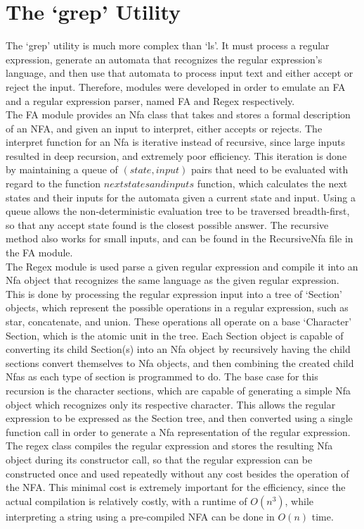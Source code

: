 \documentclass{article}
\begin{document}
\section*{The `grep' Utility}
The `grep' utility is much more complex than `ls'. It must process a regular expression, generate an automata that recognizes the regular expression's language, and then use that automata to process input text and either accept or reject the input. Therefore, modules were developed in order to emulate an FA and a regular expression parser, named FA and Regex respectively. \\
\indent The FA module provides an Nfa class that takes and stores a formal description of an NFA, and given an input to interpret, either accepts or rejects. The interpret function for an Nfa is iterative instead of recursive, since large inputs resulted in deep recursion, and extremely poor efficiency. This iteration is done by maintaining a queue of $(state, input)$ pairs that need to be evaluated with regard to the function $nextstatesandinputs$ function, which calculates the next states and their inputs for the automata given a current state and input. Using a queue allows the non-deterministic evaluation tree to be traversed breadth-first, so that any accept state found is the closest possible answer. The recursive method also works for small inputs, and can be found in the RecursiveNfa file in the FA module.\\
\indent The Regex module is used parse a given regular expression and compile it into an Nfa object that recognizes the same language as the given regular expression. This is done by processing the regular expression input into a tree of `Section' objects, which represent the possible operations in a regular expression, such as star, concatenate, and union. These operations all operate on a base `Character' Section, which is the atomic unit in the tree. Each Section object is capable of converting its child Section(s) into an Nfa object by recursively having the child sections convert themselves to Nfa objects, and then combining the created child Nfas as each type of section is programmed to do. The base case for this recursion is the character sections, which are capable of generating a simple Nfa object which recognizes only its respective character. This allows the regular expression to be expressed as the Section tree, and then converted using a single function call in order to generate a Nfa representation of the regular expression. The regex class compiles the regular expression and stores the resulting Nfa object during its constructor call, so that the regular expression can be constructed once and used repeatedly without any cost besides the operation of the NFA. This minimal cost is extremely important for the efficiency, since the actual compilation is relatively costly, with a runtime of $O(n^3)$, while interpreting a string using a pre-compiled NFA can be done in $O(n)$ time.\\
\end{document}
